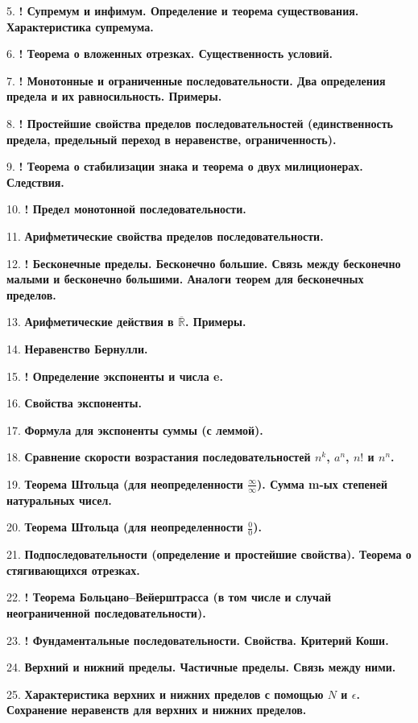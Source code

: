 \documentclass[12pt]{article}
\begin{document}
5. \textbf{! Супремум и инфимум. Определение и теорема существования. Характеристика супремума.}

6. \textbf{! Теорема о вложенных отрезках. Существенность условий.}

7. \textbf{! Монотонные и ограниченные последовательности. Два определения предела и их равносильность. Примеры.}

8. \textbf{! Простейшие свойства пределов последовательностей (единственность предела, предельный переход в неравенстве, ограниченность).}

9. \textbf{! Теорема о стабилизации знака и теорема о двух милиционерах. Следствия.}

10. \textbf{! Предел монотонной последовательности.}

11. \textbf{Арифметические свойства пределов последовательности.}

12. \textbf{! Бесконечные пределы. Бесконечно большие. Связь между бесконечно малыми и бесконечно большими. Аналоги теорем для бесконечных пределов.}

13. \textbf{Арифметические действия в $\overline{\mathbb{R}}$. Примеры.}

14. \textbf{Неравенство Бернулли.}

15. \textbf{! Определение экспоненты и числа e.}

16. \textbf{Свойства экспоненты.}

17. \textbf{Формула для экспоненты суммы (с леммой).}

18. \textbf{Сравнение скорости возрастания последовательностей $n^k$, $a^n$, $n!$ и $n^n$.}

19. \textbf{Теорема Штольца (для неопределенности $\frac{\infty}{\infty}$). Сумма m-ых степеней натуральных чисел.}

20. \textbf{Теорема Штольца (для неопределенности $\frac{0}{0}$).}

21. \textbf{Подпоследовательности (определение и простейшие свойства). Теорема о стягивающихся отрезках. }

22. \textbf{! Теорема Больцано–Вейерштрасса (в том числе и случай неограниченной последовательности).}

23. \textbf{! Фундаментальные последовательности. Свойства. Критерий Коши.}

24. \textbf{Верхний и нижний пределы. Частичные пределы. Связь между ними.}

25. \textbf{Характеристика верхних и нижних пределов с помощью $N$ и $\epsilon$. Сохранение неравенств для верхних и нижних пределов.}
\end{document}
